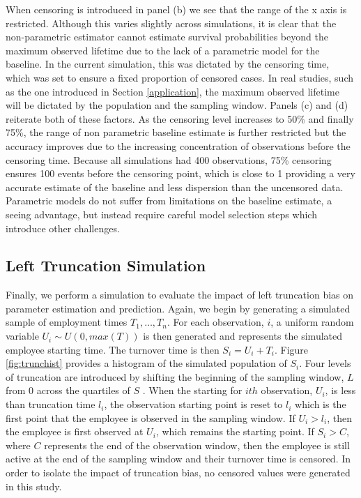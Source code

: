\documentclass[12pt,letterpaper]{article}
\begin{document}
When censoring is introduced in panel (b) we see that the range of the x axis is restricted.  Although this varies slightly across simulations, it is clear that the non-parametric estimator cannot estimate survival probabilities beyond the maximum observed lifetime due to the lack of a parametric model for the baseline.  In the current simulation, this was dictated by the censoring time, which was set to ensure a fixed proportion of censored cases.  In real studies, such as the one introduced in Section \ref{application}, the maximum observed lifetime will be dictated by the population and the sampling window.  Panels (c) and (d) reiterate both of these factors. As the censoring level increases to 50\% and finally 75\%, the range of non parametric baseline estimate is further restricted but the accuracy improves due to the increasing concentration of observations before the censoring time.  Because all simulations had 400 observations, 75\% censoring ensures 100 events before the censoring point, which is close to 1 providing a very accurate estimate of the baseline and less dispersion than the uncensored data.  Parametric models do not suffer from limitations on the baseline estimate, a seeing advantage, but instead require careful model selection steps which introduce other challenges.


\subsection{Left Truncation Simulation}

Finally, we perform a simulation to evaluate the impact of left truncation bias on parameter estimation and prediction. Again, we begin by generating a simulated sample of employment times $T_1, \ldots, T_n$.  For each observation, $i$, a uniform random variable $U_i \sim U(0,max(T))$ is then generated and represents the simulated employee starting time. The turnover time is then $S_i = U_i+T_i$. Figure \ref{fig:trunchist} provides a histogram of the simulated population of $S_i$. Four levels of truncation are introduced by shifting the beginning of the sampling window, $L$ from 0 across the quartiles of $S$ . When the starting for $ith$ observation, $U_i$, is less than truncation time $l_i$, the observation starting point is reset to $l_i$ which is the first point that the employee is observed in the sampling window. If $U_i> l_i$, then the employee is first observed at $U_i$, which remains the starting point.  If $S_i>C$, where $C$ represents the end of the observation window, then the employee is still active at the end of the sampling window and their turnover time is censored.  In order to isolate the impact of truncation bias, no censored values were generated in this study.
\end{document}
